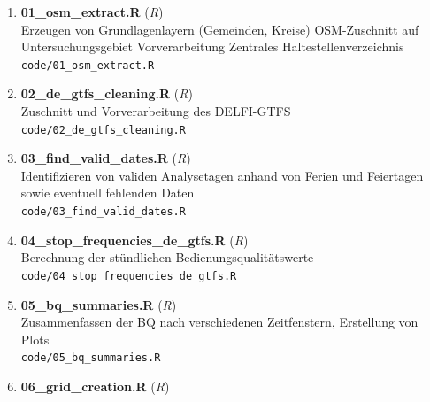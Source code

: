 \begin{enumerate}[label=\arabic*, leftmargin=*, itemsep=0.5em, topsep=0.3em]
\begin{enumerate}[label=\arabic{enumi}.\arabic*, leftmargin=*, itemsep=0.5em, topsep=0.3em]
\begin{enumerate}[label=\arabic{enumi}.\arabic{enumii}.\arabic*, leftmargin=*, itemsep=0.5em, topsep=0.3em]
\texttt{\small code/helper/polygrid\_fun.R}
\item \textbf{school\_holidays.R} \textnormal{(\textit{R})}\\
Abfrage von Schulferien per API\\
\texttt{\small code/helper/school\_holidays.R}
\item \textbf{nonholiday\_normdays\_cutoff.txt} \textnormal{(\textit{Text})}\\
Normtage im DELFI-Feed (Output von 03\_find\_valid\_dates)\\
\texttt{\small code/temp/nonholiday\_normdays\_cutoff.txt}
\item \textbf{nonholiday\_weekdays\_cutoff.txt} \textnormal{(\textit{Text})}\\
Werktage im DELFI-Feed (Output von 03\_find\_valid\_dates)\\
\texttt{\small code/temp/nonholiday\_weekdays\_cutoff.txt}
\end{enumerate}
\item \textbf{01\_osm\_extract.R} \textnormal{(\textit{R})}\\
Erzeugen von Grundlagenlayern (Gemeinden, Kreise)
OSM-Zuschnitt auf Untersuchungsgebiet
Vorverarbeitung Zentrales Haltestellenverzeichnis\\
\texttt{\small code/01\_osm\_extract.R}
\item \textbf{02\_de\_gtfs\_cleaning.R} \textnormal{(\textit{R})}\\
Zuschnitt und Vorverarbeitung des DELFI-GTFS\\
\texttt{\small code/02\_de\_gtfs\_cleaning.R}
\item \textbf{03\_find\_valid\_dates.R} \textnormal{(\textit{R})}\\
Identifizieren von validen Analysetagen anhand von Ferien und Feiertagen sowie eventuell fehlenden Daten\\
\texttt{\small code/03\_find\_valid\_dates.R}
\item \textbf{04\_stop\_frequencies\_de\_gtfs.R} \textnormal{(\textit{R})}\\
Berechnung der stündlichen Bedienungsqualitätswerte\\
\texttt{\small code/04\_stop\_frequencies\_de\_gtfs.R}
\item \textbf{05\_bq\_summaries.R} \textnormal{(\textit{R})}\\
Zusammenfassen der BQ nach verschiedenen Zeitfenstern, Erstellung von Plots\\
\texttt{\small code/05\_bq\_summaries.R}
\item \textbf{06\_grid\_creation.R} \textnormal{(\textit{R})}\\

\end{enumerate}
\end{enumerate}
